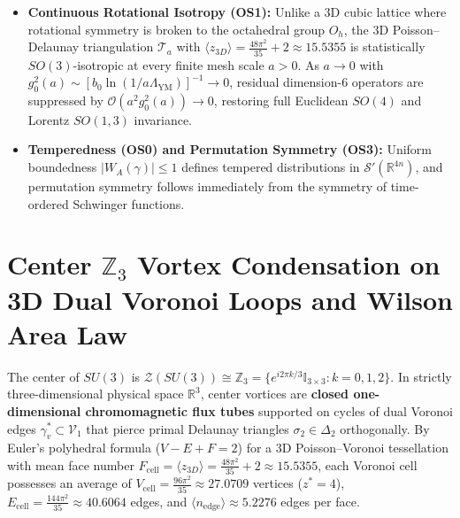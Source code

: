 \documentclass[11pt, a4paper]{article}
\theoremstyle{definition}
\theoremstyle{remark}
\begin{document}
\begin{itemize}
  \item \textbf{Continuous Rotational Isotropy (OS1):} Unlike a 3D cubic lattice where rotational symmetry is broken to the octahedral group $O_{h}$, the 3D Poisson--Delaunay triangulation $\mathcal{T}_{a}$ with $\langle z_{3D} \rangle = \frac{48\pi^{2}}{35} + 2 \approx 15.5355$ is statistically $SO(3)$-isotropic at every finite mesh scale $a > 0$. As $a \to 0$ with $g_{0}^{2}(a) \sim [b_{0}\ln(1/a\Lambda_{\mathrm{YM}})]^{-1} \to 0$, residual dimension-6 operators are suppressed by $\mathcal{O}(a^{2}g_{0}^{2}(a)) \to 0$, restoring full Euclidean $SO(4)$ and Lorentz $SO(1,3)$ invariance.
  \item \textbf{Temperedness (OS0) and Permutation Symmetry (OS3):} Uniform boundedness $|W_{A}(\gamma)| \le 1$ defines tempered distributions in $\mathcal{S}'(\mathbb{R}^{4n})$, and permutation symmetry follows immediately from the symmetry of time-ordered Schwinger functions.
\end{itemize}

\section{Center $\mathbb{Z}_{3}$ Vortex Condensation on 3D Dual Voronoi Loops and Wilson Area Law}

The center of $SU(3)$ is $\mathcal{Z}(SU(3)) \cong \mathbb{Z}_{3} = \{e^{i2\pi k/3}\mathbb{I}_{3\times 3} : k = 0, 1, 2\}$. In strictly three-dimensional physical space $\mathbb{R}^{3}$, center vortices are \textbf{closed one-dimensional chromomagnetic flux tubes} supported on cycles of dual Voronoi edges $\gamma_{v}^{*} \subset \mathcal{V}_{1}$ that pierce primal Delaunay triangles $\sigma_{2} \in \Delta_{2}$ orthogonally. By Euler's polyhedral formula ($V - E + F = 2$) for a 3D Poisson--Voronoi tessellation with mean face number $F_{\mathrm{cell}} = \langle z_{3D} \rangle = \frac{48\pi^{2}}{35} + 2 \approx 15.5355$, each Voronoi cell possesses an average of $V_{\mathrm{cell}} = \frac{96\pi^{2}}{35} \approx 27.0709$ vertices ($z^{*} = 4$), $E_{\mathrm{cell}} = \frac{144\pi^{2}}{35} \approx 40.6064$ edges, and $\langle n_{\mathrm{edge}} \rangle \approx 5.2276$ edges per face.
\end{document}
